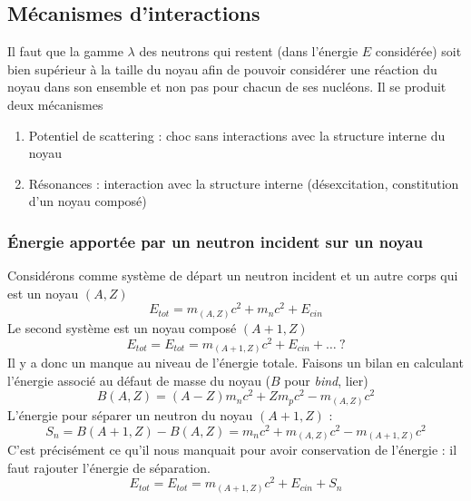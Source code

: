 \subsection{Mécanismes d'interactions}
Il faut que la gamme $\lambda$ des neutrons qui restent (dans l'énergie $E$ considérée) soit bien 
supérieur à la taille du noyau afin de pouvoir considérer une réaction du  noyau dans son ensemble
et non pas pour chacun de ses nucléons. Il se produit deux mécanismes
\begin{enumerate}
\item Potentiel de scattering : choc sans interactions avec la structure interne du noyau
\item Résonances : interaction avec la structure interne (désexcitation, constitution d'un noyau 
composé)
\end{enumerate}

\subsubsection{Énergie apportée par un neutron incident sur un noyau}
Considérons comme système de départ un neutron incident et un autre corps qui est un noyau $(A,Z)$
\begin{equation}
E_{tot} = m_{(A,Z)}c^2 + m_nc^2+E_{cin}
\end{equation}
Le second système est un noyau composé $(A+1, Z)$
\begin{equation}
E_{tot}=E_{tot} = m_{(A+1,Z)}c^2 +E_{cin}+\dots\ ? 
\end{equation}
Il y a donc un manque au niveau de l'énergie totale. Faisons un bilan en calculant l'énergie 
associé au défaut de masse du noyau ($B$ pour \textit{bind}, lier)
\begin{equation}
B(A,Z) = (A-Z)m_nc^2+Zm_pc^2 - m_{(A,Z)}c^2
\end{equation}
L'énergie pour séparer un neutron du noyau $(A+1,Z)$ :
\begin{equation}
S_n = B(A+1,Z)-B(A,Z) = m_nc^2+m_{(A,Z)}c^2-m_{(A+1,Z)}c^2
\end{equation}
C'est précisément ce qu'il nous manquait pour avoir conservation de l'énergie : il faut 
rajouter l'énergie de séparation.
\begin{equation}
E_{tot}=E_{tot} = m_{(A+1,Z)}c^2 +E_{cin}+S_n
\end{equation}

